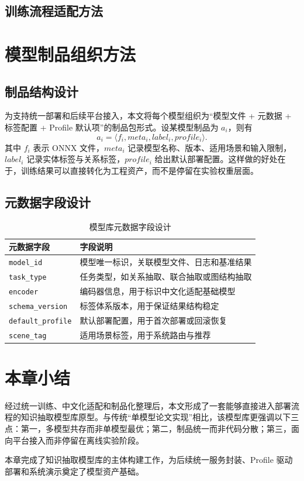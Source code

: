 \subsection{训练流程适配方法}

\section{模型制品组织方法}
\subsection{制品结构设计}
为支持统一部署和后续平台接入，本文将每个模型组织为“模型文件 + 元数据 + 标签配置 + Profile 默认项”的制品包形式。设某模型制品为 $a_i$，则有
\begin{equation}
a_i=\langle f_i,meta_i,label_i,profile_i \rangle.
\end{equation}
其中 $f_i$ 表示 ONNX 文件，$meta_i$ 记录模型名称、版本、适用场景和输入限制，$label_i$ 记录实体标签与关系标签，$profile_i$ 给出默认部署配置。这样做的好处在于，训练结果可以直接转化为工程资产，而不是停留在实验权重层面。

\subsection{元数据字段设计}
\begin{table}[htbp]
  \centering
  \caption{模型库元数据字段设计}
  \vspace{0.5em}\wuhao
  \begin{tabularx}{\textwidth}{l X}
    \toprule
    元数据字段 & 字段说明 \\
    \midrule
    \texttt{model\_id} & 模型唯一标识，关联模型文件、日志和基准结果 \\
    \texttt{task\_type} & 任务类型，如关系抽取、联合抽取或图结构抽取 \\
    \texttt{encoder} & 编码器信息，用于标识中文化适配基础模型 \\
    \texttt{schema\_version} & 标签体系版本，用于保证结果结构稳定 \\
    \texttt{default\_profile} & 默认部署配置，用于首次部署或回滚恢复 \\
    \texttt{scene\_tag} & 适用场景标签，用于系统路由与推荐 \\
    \bottomrule
  \end{tabularx}
  \label{tab:model_metadata_compact}
\end{table}

\section{本章小结}
经过统一训练、中文化适配和制品化整理后，本文形成了一套能够直接进入部署流程的知识抽取模型库原型。与传统“单模型论文实现”相比，该模型库更强调以下三点：第一，多模型共存而非单模型最优；第二，制品统一而非代码分散；第三，面向平台接入而非停留在离线实验阶段。

本章完成了知识抽取模型库的主体构建工作，为后续统一服务封装、Profile 驱动部署和系统演示奠定了模型资产基础。
